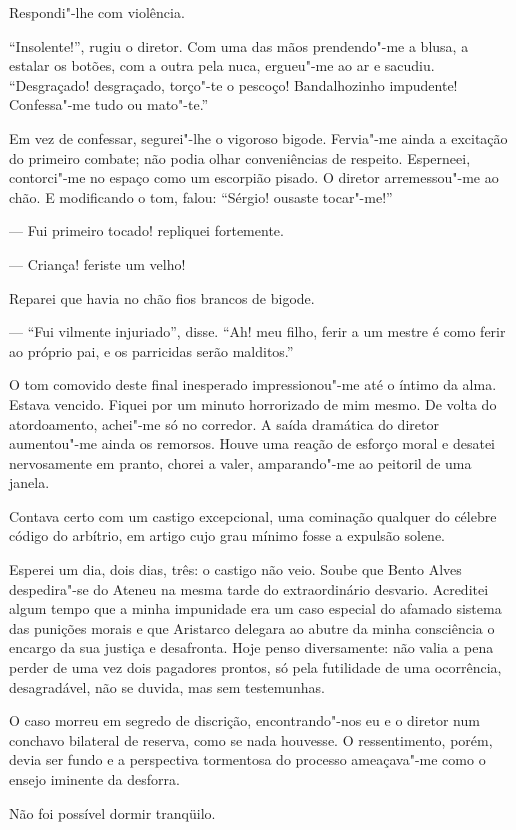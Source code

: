 Respondi"-lhe com violência. 

``Insolente!'', rugiu o diretor. Com uma das
mãos prendendo"-me a blusa, a estalar os botões, com a outra pela
nuca, ergueu"-me ao ar e sacudiu. ``Desgraçado! desgraçado, torço"-te
o pescoço! Bandalhozinho impudente! Confessa"-me tudo ou mato"-te.''

Em vez de confessar, segurei"-lhe o vigoroso bigode. Fervia"-me ainda
a excitação do primeiro combate; não podia olhar conveniências de
respeito. Esperneei, contorci"-me no espaço como um escorpião pisado.
O diretor arremessou"-me ao chão. E modificando o tom, falou: ``Sérgio!
ousaste tocar"-me!'' 

--- Fui primeiro tocado! repliquei fortemente. 

--- Criança! feriste um velho! 

Reparei que havia no chão fios brancos de bigode. 

--- ``Fui vilmente injuriado'', disse. ``Ah! meu filho, ferir a
um mestre é como ferir ao próprio pai, e os parricidas serão malditos.''

O tom comovido deste final inesperado impressionou"-me até o íntimo da
alma. Estava vencido. Fiquei por um minuto horrorizado de mim mesmo. De
volta do atordoamento, achei"-me só no corredor. A saída dramática do
diretor aumentou"-me ainda os remorsos. Houve uma reação de esforço
moral e desatei nervosamente em pranto, chorei a valer, amparando"-me
ao peitoril de uma janela. 

Contava certo com um castigo excepcional,
uma cominação qualquer do célebre código do arbítrio, em artigo cujo
grau mínimo fosse a expulsão solene. 

Esperei um dia, dois dias, três: o
castigo não veio. Soube que Bento Alves despedira"-se do Ateneu na
mesma tarde do extraordinário desvario. Acreditei algum tempo que a
minha impunidade era um caso especial do afamado sistema das punições
morais e que Aristarco delegara ao abutre da minha consciência o
encargo da sua justiça e desafronta. Hoje penso diversamente: não valia
a pena perder de uma vez dois pagadores prontos, só pela futilidade de
uma ocorrência, desagradável, não se duvida, mas sem testemunhas. 

O caso morreu em segredo de discrição, encontrando"-nos eu e o diretor
num conchavo bilateral de reserva, como se nada houvesse. O
ressentimento, porém, devia ser fundo e a perspectiva tormentosa do
processo ameaçava"-me como o ensejo iminente da desforra.

Não foi possível dormir tranqüilo. 

